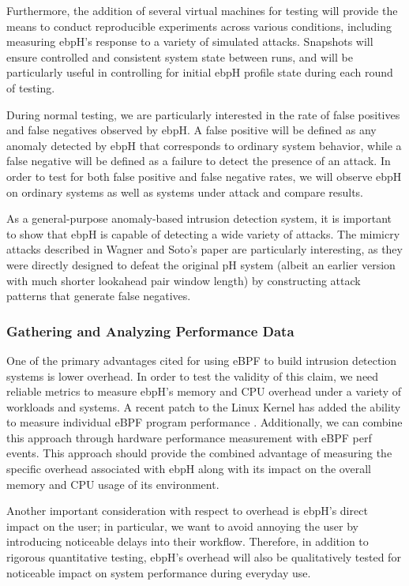 \documentclass[
  12pt]{findlay}
\begin{document}
Furthermore, the addition of several virtual machines for testing will
provide the means to conduct reproducible experiments across various
conditions, including measuring ebpH's response to a variety of
simulated attacks. Snapshots will ensure controlled and consistent
system state between runs, and will be particularly useful in
controlling for initial ebpH profile state during each round of testing.

During normal testing, we are particularly interested in the rate of
false positives and false negatives observed by ebpH. A false positive
will be defined as any anomaly detected by ebpH that corresponds to
ordinary system behavior, while a false negative will be defined as a
failure to detect the presence of an attack. In order to test for both
false positive and false negative rates, we will observe ebpH on
ordinary systems as well as systems under attack and compare results.

As a general-purpose anomaly-based intrusion detection system, it is
important to show that ebpH is capable of detecting a wide variety of
attacks. The mimicry attacks described in Wagner and Soto's paper
\autocite{wagner02} are particularly interesting, as they were directly
designed to defeat the original pH system (albeit an earlier version
with much shorter lookahead pair window length) by constructing attack
patterns that generate false negatives.

\hypertarget{gathering-and-analyzing-performance-data}{%
\subsubsection{Gathering and Analyzing Performance
Data}\label{gathering-and-analyzing-performance-data}}

One of the primary advantages cited for using eBPF to build intrusion
detection systems is lower overhead. In order to test the validity of
this claim, we need reliable metrics to measure ebpH's memory and CPU
overhead under a variety of workloads and systems. A recent patch to the
Linux Kernel has added the ability to measure individual eBPF program
performance \autocite{starovoitov19a}. Additionally, we can combine this
approach through hardware performance measurement with eBPF perf events.
This approach should provide the combined advantage of measuring the
specific overhead associated with ebpH along with its impact on the
overall memory and CPU usage of its environment.

Another important consideration with respect to overhead is ebpH's
direct impact on the user; in particular, we want to avoid annoying the
user by introducing noticeable delays into their workflow. Therefore, in
addition to rigorous quantitative testing, ebpH's overhead will also be
qualitatively tested for noticeable impact on system performance during
everyday use.
\end{document}
